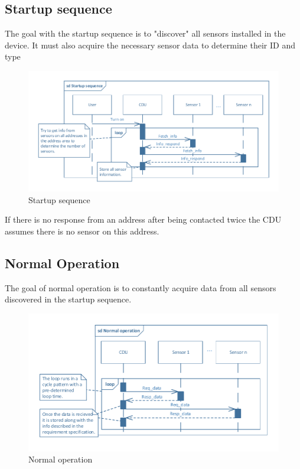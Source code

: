 \subsection{Startup sequence}
The goal with the startup sequence is to "discover" all sensors installed in the device. It must also acquire the necessary sensor data to determine their ID and type\\

\begin{figure}[hbpt]
\centering
\includegraphics[width=.9\textwidth]{billeder/Startup_Sequence_SD}
\caption{Startup sequence}
\end{figure}
If there is no response from an address after being contacted twice the CDU assumes there is no sensor on this address.


\subsection{Normal Operation}
The goal of normal operation is to constantly acquire data from all sensors discovered in the startup sequence.

\begin{figure}[hbpt]
\centering
\includegraphics[width=.9\textwidth]{billeder/normal_operation_SD}
\caption{Normal operation}
\end{figure}

